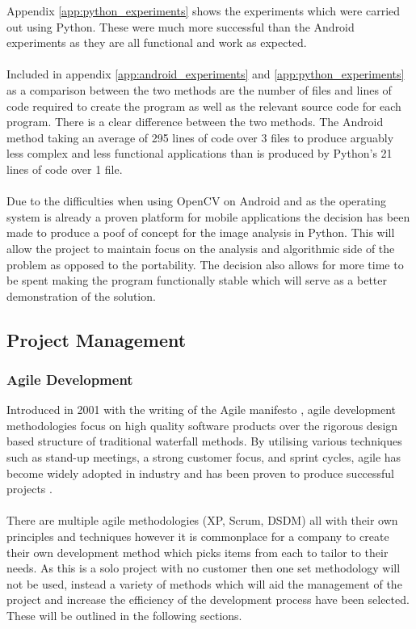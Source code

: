 		Appendix \ref{app:python_experiments} shows the experiments which were carried out using Python. These were much more successful than the Android experiments as they are all functional and work as expected.
		\\\\
		Included in appendix \ref{app:android_experiments} and \ref{app:python_experiments} as a comparison between the two methods are the number of files and lines of code required to create the program as well as the relevant source code for each program. There is a clear difference between the two methods. The Android method taking an average of 295 lines of code over 3 files to produce arguably less complex and less functional applications than is produced by Python's 21 lines of code over 1 file.
		\\\\
		Due to the difficulties when using OpenCV on Android and as the operating system is already a proven platform for mobile applications the decision has been made to produce a poof of concept for the image analysis in Python. This will allow the project to maintain focus on the analysis and algorithmic side of the problem as opposed to the portability. The decision also allows for more time to be spent making the program functionally stable which will serve as a better demonstration of the solution.
\subsection{Project Management}
	\subsubsection{Agile Development}
		Introduced in 2001 with the writing of the Agile manifesto \citep{beck2001manifesto}, agile development methodologies focus on high quality software products over the rigorous design based structure of traditional waterfall methods. By utilising various techniques such as stand-up meetings, a strong customer focus, and sprint cycles, agile has become widely adopted in industry and has been proven to produce successful projects \citep{state_of_agile_2015}.
		\\\\
		There are multiple agile methodologies (XP, Scrum, DSDM) all with their own principles and techniques however it is commonplace for a company to create their own development method which picks items from each to tailor to their needs. As this is a solo project with no customer then one set methodology will not be used, instead a variety of methods which will aid the management of the project and increase the efficiency of the development process have been selected. These will be outlined in the following sections.
